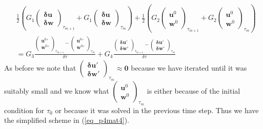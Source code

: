 \documentclass[11pt,fleqn]{article}
\theoremstyle{defstyle}
\begin{document}
\begin{equation}
\begin{aligned}
&\frac{1}{2} \left(G_1 \begin{pmatrix}
\mathbf{\delta u} \\ \mathbf{\delta w} 
\end{pmatrix}_{\tau_{m+1}} + G_1 \begin{pmatrix}
\mathbf{\delta u} \\ \mathbf{\delta w} 
\end{pmatrix}_{\tau_{m}}\right) +\frac{1}{2} \left(G_2 \begin{pmatrix}
\mathbf{u}^0 \\ \mathbf{w}^0 
\end{pmatrix}_{\tau_{m+1}} + G_2 \begin{pmatrix}
\mathbf{u}^0 \\ \mathbf{w}^0 
\end{pmatrix}_{\tau_{m}}\right)
\\ &= G_3 \frac{\begin{pmatrix}
\mathbf{u}^0\prime \\ \mathbf{w}^0\prime 
\end{pmatrix}_{\tau_{m+1}} - \begin{pmatrix}
\mathbf{u}^0\prime \\ \mathbf{w}^0\prime 
\end{pmatrix}_{\tau_{m}}}{\delta \tau} + G_4 \frac{\begin{pmatrix}
\mathbf{\delta u}\prime \\ \mathbf{\delta w}\prime 
\end{pmatrix}_{\tau_{m+1}} - \begin{pmatrix}
\mathbf{\delta u}\prime \\ \mathbf{\delta w}\prime 
\end{pmatrix}_{\tau_{m}}}{\delta \tau} 
\end{aligned}
\label{eq_p4mat3}
\end{equation}
As before we note that $\begin{pmatrix}
\mathbf{\delta u}\prime \\ \mathbf{\delta w}\prime 
\end{pmatrix}_{\tau_{m}} \approx \mathbf{0}$ because we have iterated until it was suitably small and we know what $\begin{pmatrix}
\mathbf{u}^0 \\ \mathbf{w}^0 \end{pmatrix}_{\tau_{m}}$ is either because of the initial condition for $\tau_0$ or because it was solved in the previous time step. Thus we have the simplified scheme in (\ref{eq_p4mat4}).
\end{document}
